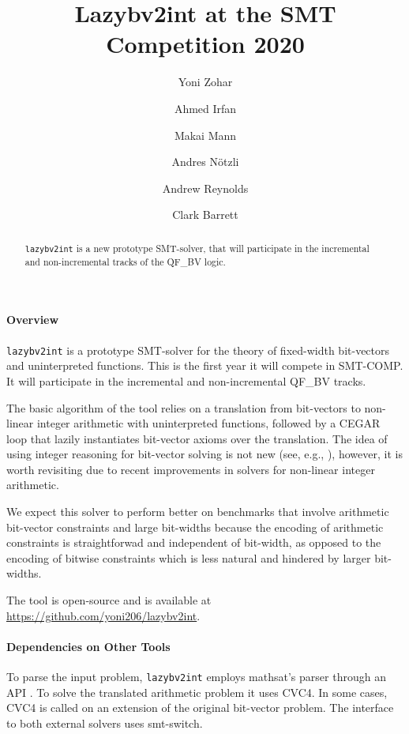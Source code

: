 \documentclass{easychair}
\newcommand{\lazybvtoint}{\texttt{lazybv2int}\xspace}
\newcommand{\smtcomp}{SMT-COMP\xspace}
\newcommand{\qfbv}{QF\_BV\xspace}
\newcommand{\msat}{mathsat\xspace}
\newcommand{\cvcfour}{CVC4\xspace}
\newcommand{\smtswitch}{smt-switch\xspace}
\begin{document}
\author{
		Yoni Zohar\and
		Ahmed Irfan \and
		Makai Mann \and
		Andres N\"otzli \and
		Andrew Reynolds\and
		Clark Barrett
}

\title{Lazybv2int at the SMT Competition 2020}

\maketitle


\noindent
\begin{abstract}
\lazybvtoint is a new prototype SMT-solver, that  will participate in the incremental and non-incremental tracks of the \qfbv logic.
\end{abstract}

\paragraph{Overview}
\lazybvtoint is a prototype SMT-solver for the theory of fixed-width bit-vectors and uninterpreted functions.
This is the first year it will compete in \smtcomp.
It will participate in the incremental and non-incremental \qfbv tracks.

The basic algorithm of the tool relies on a translation from bit-vectors to
non-linear integer arithmetic with uninterpreted functions, followed by
a CEGAR loop \cite{cegar} that lazily instantiates bit-vector axioms over the translation.
The idea of using integer reasoning for bit-vector solving is not new (see,
e.g., \cite{DBLP:journals/entcs/BozzanoBCFHKPS06,DBLP:conf/fmcad/BackemanRZ18}), however, it is worth revisiting due to recent improvements in solvers for non-linear integer arithmetic.

We expect this solver to perform better on benchmarks that involve arithmetic
bit-vector constraints and large bit-widths because the encoding of arithmetic
constraints is straightforwad and independent of bit-width, as opposed to the
encoding of bitwise constraints which is less natural and hindered by larger
bit-widths.

The tool is open-source and is available at \url{https://github.com/yoni206/lazybv2int}.

\paragraph{Dependencies on Other Tools}
%
To parse the input problem, \lazybvtoint employs \msat's
parser through an API \cite{mathsat5}.
To solve the translated arithmetic problem it uses \cvcfour \cite{cvc4}.
In some cases, \cvcfour is called on an extension of the original bit-vector problem.
%
The interface to both external solvers uses
\smtswitch \cite{smtswitchgithub}.
\end{document}
